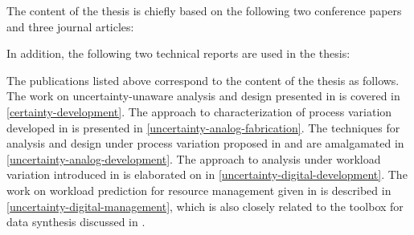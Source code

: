 The content of the thesis is chiefly based on the following two conference
papers and three journal articles:

\printbibliography[heading=none,keyword=own]

In addition, the following two technical reports are used in the thesis:

\printbibliography[heading=none,keyword=own-unpublished]

The publications listed above correspond to the content of the thesis as
follows. The work on uncertainty-unaware analysis and design presented in
\cite{ukhov2012} is covered in \cref{certainty-development}. The approach to
characterization of process variation developed in \cite{ukhov2014a} is
presented in \cref{uncertainty-analog-fabrication}. The techniques for analysis
and design under process variation proposed in \cite{ukhov2014b} and
\cite{ukhov2015} are amalgamated in \cref{uncertainty-analog-development}. The
approach to analysis under workload variation introduced in \cite{ukhov2017a} is
elaborated on in \cref{uncertainty-digital-development}. The work on workload
prediction for resource management given in \cite{ukhov2017b} is described in
\cref{uncertainty-digital-management}, which is also closely related to the
toolbox for data synthesis discussed in \cite{ukhov2017c}.

